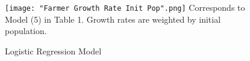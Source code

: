 \documentclass[11pt, oneside]{article}
\begin{document}


\begin{figure}
\caption{Logistic Regression Model}
  \texttt{[image: "Farmer Growth Rate Init Pop".png]} 
Corresponds to Model (5) in Table 1. Growth rates are weighted by initial population.
\end{figure}
\end{document}
